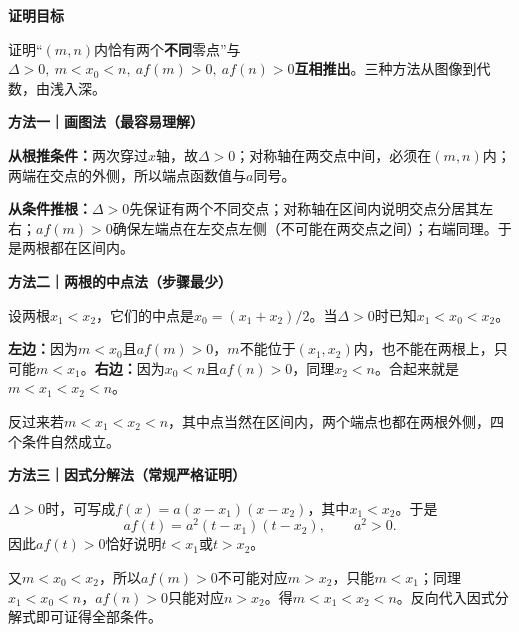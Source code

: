 \begin{proofbox}
\textbf{\textcolor{CProof}{证明目标}}\par
证明“$(m,n)$内恰有两个\textbf{不同}零点”与
$\Delta>0,\ m<x_0<n,\ af(m)>0,\ af(n)>0$\textbf{互相推出}。三种方法从图像到代数，由浅入深。

\medskip
\textbf{\textcolor{CProof}{方法一｜画图法（最容易理解）}}\par
\textbf{从根推条件：}两次穿过$x$轴，故$\Delta>0$；对称轴在两交点中间，必须在$(m,n)$内；两端在交点的外侧，所以端点函数值与$a$同号。
\par\textbf{从条件推根：}$\Delta>0$先保证有两个不同交点；对称轴在区间内说明交点分居其左右；$af(m)>0$确保左端点在左交点左侧（不可能在两交点之间）；右端同理。于是两根都在区间内。
\begin{center}

\end{center}

\medskip
\textbf{\textcolor{CProof}{方法二｜两根的中点法（步骤最少）}}\par
设两根$x_1<x_2$，它们的中点是$x_0=(x_1+x_2)/2$。当$\Delta>0$时已知$x_1<x_0<x_2$。
\par\textbf{左边：}因为$m<x_0$且$af(m)>0$，$m$不能位于$(x_1,x_2)$内，也不能在两根上，只可能$m<x_1$。\textbf{右边：}因为$x_0<n$且$af(n)>0$，同理$x_2<n$。合起来就是$m<x_1<x_2<n$。
\par 反过来若$m<x_1<x_2<n$，其中点当然在区间内，两个端点也都在两根外侧，四个条件自然成立。
\begin{center}

\end{center}

\medskip
\textbf{\textcolor{CProof}{方法三｜因式分解法（常规严格证明）}}\par
$\Delta>0$时，可写成$f(x)=a(x-x_1)(x-x_2)$，其中$x_1<x_2$。于是
\[af(t)=a^2(t-x_1)(t-x_2),\qquad a^2>0.\]
因此$af(t)>0$恰好说明$t<x_1$或$t>x_2$。
\par 又$m<x_0<x_2$，所以$af(m)>0$不可能对应$m>x_2$，只能$m<x_1$；同理$x_1<x_0<n$，$af(n)>0$只能对应$n>x_2$。得$m<x_1<x_2<n$。反向代入因式分解式即可证得全部条件。
\begin{center}

\end{center}


\end{proofbox}
